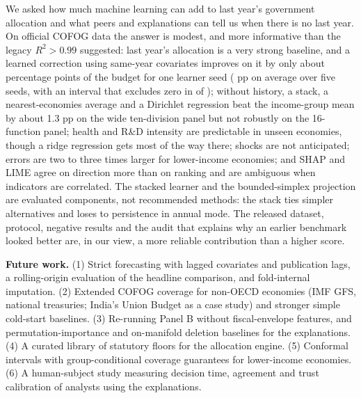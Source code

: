 We asked how much machine learning can add to last year's government allocation and what peers and explanations can tell us when there is no last year. On official COFOG data the answer is modest, and more informative than the legacy $R^2>0.99$ suggested: last year's allocation is a very strong baseline, and a learned correction using same-year covariates improves on it by only about \ResPairedGain{} percentage points of the budget for one learner seed (\AnnSeedMeanGain{} pp on average over five seeds, with an interval that excludes zero in \AnnSeedNExcl{} of \AnnSeedN); without history, a stack, a nearest-economies average and a Dirichlet regression beat the income-group mean by about 1.3 pp on the wide ten-division panel but not robustly on the 16-function panel; health and R\&D intensity are predictable in unseen economies, though a ridge regression gets most of the way there; shocks are not anticipated; errors are two to three times larger for lower-income economies; and SHAP and LIME agree on direction more than on ranking and are ambiguous when indicators are correlated. The stacked learner and the bounded-simplex projection are evaluated components, not recommended methods: the stack ties simpler alternatives and loses to persistence in annual mode. The released dataset, protocol, negative results and the audit that explains why an earlier benchmark looked better are, in our view, a more reliable contribution than a higher score.

\textbf{Future work.} (1) Strict forecasting with lagged covariates and publication lags, a rolling-origin evaluation of the headline comparison, and fold-internal imputation. (2) Extended COFOG coverage for non-OECD economies (IMF GFS, national treasuries; India's Union Budget as a case study) and stronger simple cold-start baselines. (3) Re-running Panel B without fiscal-envelope features, and permutation-importance and on-manifold deletion baselines for the explanations. (4) A curated library of statutory floors for the allocation engine. (5) Conformal intervals with group-conditional coverage guarantees for lower-income economies. (6) A human-subject study measuring decision time, agreement and trust calibration of analysts using the explanations.

